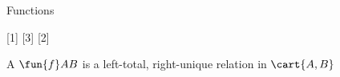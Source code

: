 \begin{omgroup}[id=sec.functions,creators=miko]{Functions}
\begin{module}[id=functions]
[1]{}
[3]{}
[2]{}

\begin{definition}[id=functions.def]
  A {} $\fun{f}AB$ is a left-total, right-unique relation in $\cart{A,B}$
\end{definition}
\end{module}
\end{omgroup}
